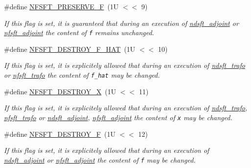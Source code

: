 \begin{CompactItemize}
\#define \hyperlink{group__nfsft_g45962e763c2c551c1ea764a68b686b5c}{NFSFT\_\-PRESERVE\_\-F}~(1U $<$$<$ 9)
\begin{CompactList}\small\item\em If this flag is set, it is guaranteed that during an execution of \hyperlink{group__nfsft_g88c7be3ead1c726a1d5b8b903952c527}{ndsft\_\-adjoint} or \hyperlink{group__nfsft_g813bb48d404c7286310733c99a81a169}{nfsft\_\-adjoint} the content of {\tt f} remains unchanged. \item\end{CompactList}\item 
\#define \hyperlink{group__nfsft_ga808899fc4db422c7b23470e6baad904}{NFSFT\_\-DESTROY\_\-F\_\-HAT}~(1U $<$$<$ 10)
\begin{CompactList}\small\item\em If this flag is set, it is explicitely allowed that during an execution of \hyperlink{group__nfsft_gc1bcdf551a0bf1b4a5890b87e583caf8}{ndsft\_\-trafo} or \hyperlink{group__nfsft_g5796fc68c432d46dfcab7abd8c56ee22}{nfsft\_\-trafo} the content of {\tt f\_\-hat} may be changed. \item\end{CompactList}\item 
\#define \hyperlink{group__nfsft_g6f22df0b292db920d795b3e3569181f2}{NFSFT\_\-DESTROY\_\-X}~(1U $<$$<$ 11)
\begin{CompactList}\small\item\em If this flag is set, it is explicitely allowed that during an execution of \hyperlink{group__nfsft_gc1bcdf551a0bf1b4a5890b87e583caf8}{ndsft\_\-trafo}, \hyperlink{group__nfsft_g5796fc68c432d46dfcab7abd8c56ee22}{nfsft\_\-trafo} or \hyperlink{group__nfsft_g88c7be3ead1c726a1d5b8b903952c527}{ndsft\_\-adjoint}, \hyperlink{group__nfsft_g813bb48d404c7286310733c99a81a169}{nfsft\_\-adjoint} the content of {\tt x} may be changed. \item\end{CompactList}\item 
\#define \hyperlink{group__nfsft_g2b32e2eabd33bf0886f6df45365d04c0}{NFSFT\_\-DESTROY\_\-F}~(1U $<$$<$ 12)
\begin{CompactList}\small\item\em If this flag is set, it is explicitely allowed that during an execution of \hyperlink{group__nfsft_g88c7be3ead1c726a1d5b8b903952c527}{ndsft\_\-adjoint} or \hyperlink{group__nfsft_g813bb48d404c7286310733c99a81a169}{nfsft\_\-adjoint} the content of {\tt f} may be changed. \item\end{CompactList}\item 

\end{CompactItemize}
